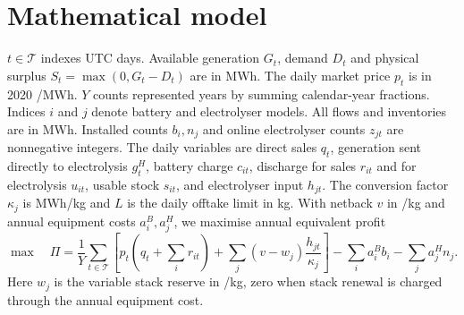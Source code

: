 \section{Mathematical model}\label{sec:model1}
\(t\in\mathcal T\) indexes UTC days. Available generation \(G_t\), demand
\(D_t\) and physical surplus \(S_t=\max(0,G_t-D_t)\) are in MWh.
The daily market price \(p_t\) is in 2020 \gbp/MWh. \(Y\) counts represented
years by summing calendar-year fractions. Indices \(i\) and \(j\) denote
battery and electrolyser models. All flows and inventories are in MWh. Installed counts
\(b_i,n_j\) and online electrolyser counts \(z_{jt}\) are nonnegative
integers. The daily variables are direct sales \(q_t\), generation sent
directly to electrolysis \(g_t^H\), battery charge \(c_{it}\),
discharge for sales \(r_{it}\) and for electrolysis \(u_{it}\), usable stock
\(s_{it}\), and electrolyser input \(h_{jt}\). The conversion factor
\(\kappa_j\) is MWh/kg and \(L\) is the daily offtake limit in kg.
With netback \(v\) in \gbp/kg and annual equipment costs \(a_i^B,a_j^H\),
we maximise annual equivalent profit
\begin{equation}
\max\quad \Pi =
\frac{1}{Y}\sum_{t\in\mathcal T}
\left[p_t\left(q_t+\sum_i r_{it}\right)+
\sum_j (v-w_j)\frac{h_{jt}}{\kappa_j}\right]
-\sum_i a_i^B b_i-\sum_j a_j^H n_j .
\label{eq:profit}
\end{equation}
Here \(w_j\) is the variable stack reserve in \gbp/kg, zero when
stack renewal is charged through the annual equipment cost.

